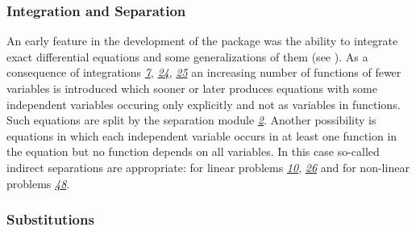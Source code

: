 \subsubsection{Integration and Separation}

An early feature in the development of the package  was
the ability to integrate exact differential equations and some
generalizations of them (see \cite{Wolf:2000}).  As a consequence of
integrations \hyperlink{crack-m_7}{\emph{7}},
\hyperlink{crack-m_24}{\emph{24}}, \hyperlink{crack-m_25}{\emph{25}} an
increasing number of functions of fewer variables is introduced which
sooner or later produces equations with some independent variables
occuring only explicitly and not as variables in functions.  Such
equations are split by the separation module
\hyperlink{crack-m_2}{\emph{2}}.  Another possibility is equations in
which each independent variable occurs in at least one function in the
equation but no function depends on all variables.  In this case
so-called indirect separations are appropriate: for linear problems
\hyperlink{crack-m_10}{\emph{10}}, \hyperlink{crack-m_26}{\emph{26}} and
for non-linear problems \hyperlink{crack-m_48}{\emph{48}}.

\subsubsection{Substitutions}

